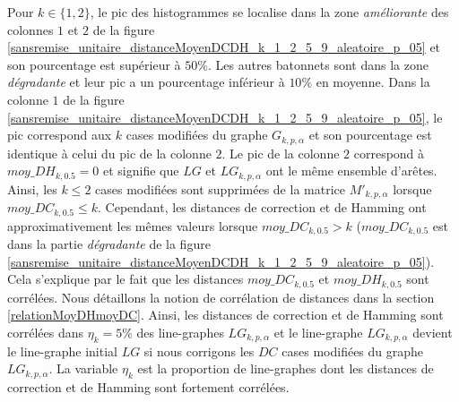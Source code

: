 Pour $k \in \{1,2\}$, le pic des histogrammes se localise dans la zone {\em am\'eliorante} des colonnes $1$ et $2$ de la figure \ref{sansremise_unitaire_distanceMoyenDCDH_k_1_2_5_9_aleatoire_p_05} et son pourcentage est sup\'erieur \`a $50\%$. 
Les autres batonnets sont dans la zone {\em d\'egradante} et leur pic a un pourcentage inf\'erieur \`a $10\%$ en moyenne. 
Dans la colonne $1$ de la figure \ref{sansremise_unitaire_distanceMoyenDCDH_k_1_2_5_9_aleatoire_p_05}, le pic correspond aux $k$ cases modifi\'ees du graphe $G_{k,p,\alpha}$ et son pourcentage est identique \`a celui du pic de la colonne $2$. 
Le pic de la colonne $2$ correspond \`a $moy\_DH_{k,0.5} = 0$ et signifie que  $LG$ et $LG_{k,p,\alpha}$ ont le m\^eme ensemble d'ar\^etes. Ainsi, les $k \le 2$ cases modifi\'ees sont supprim\'ees de la matrice $M'_{k,p,\alpha}$ lorsque $moy\_DC_{k,0.5} \le k$.
Cependant, les distances de correction et de Hamming ont approximativement les m\^emes valeurs lorsque $moy\_DC_{k,0.5} > k$ ($moy\_DC_{k,0.5}$ est dans la partie {\em d\'egradante} de la figure \ref{sansremise_unitaire_distanceMoyenDCDH_k_1_2_5_9_aleatoire_p_05}). 
Cela s'explique par le fait que les distances $moy\_DC_{k,0.5}$ et $moy\_DH_{k,0.5}$ sont corr\'el\'ees. Nous d\'etaillons la notion de corr\'elation de distances dans la section \ref{relationMoyDHmoyDC}.
Ainsi, les distances de correction et de Hamming sont corr\'el\'ees dans $\eta_k = 5\%$ des line-graphes $LG_{k,p,\alpha}$ et le line-graphe $LG_{k,p,\alpha}$ devient le line-graphe initial $LG$ si nous corrigons les $DC$ cases modifi\'ees du graphe $LG_{k,p,\alpha}$. 
La variable $\eta_k$ est la proportion de line-graphes dont les distances de correction et de Hamming sont fortement corr\'el\'ees.
\newline

